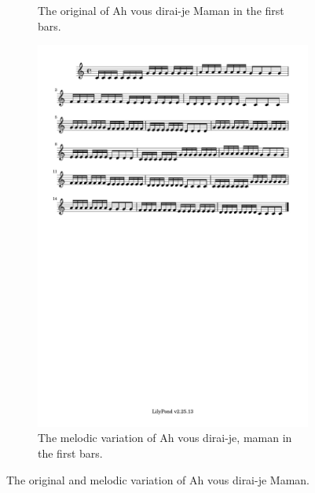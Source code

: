 \documentclass[11pt]{article}
\theoremstyle{definition}
\begin{document}
\begin{figure}
\begin{subfigure}{\textwidth}
\caption{The original of Ah vous dirai-je Maman in the first bars.}
\label{fig:MV1} 
\end{subfigure}
\begin{subfigure}{\textwidth}
\centering
\includegraphics[trim=1cm 26.5cm 8.615cm 0.5cm, clip, scale=0.8]{melody_variation.pdf}
\caption{The melodic variation of Ah vous dirai-je, maman in the first bars.}
\label{fig:MV2}
\end{subfigure}
\caption{The original and melodic variation of Ah vous dirai-je Maman.}
\end{figure}
\end{document}
